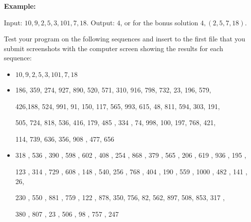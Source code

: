\documentclass[11pt]{article}
\begin{document}
\textbf{Example:}

Input: $10,9,2,5,3,101,7, 18$.
Output: $4$,  or for the bonus solution $4, (2,5,7,18)$.
\smallskip

Test your program on the following sequences and insert to the first file that you submit  screenshots with the computer screen showing the results for each sequence:

\begin{itemize}
\item $10,9,2,5,3,101, 7, 18$
\item 186, 359, 274,  927,  890,  520,  571,  310,  916,  798,  732,  23, 196, 579, 

426,188,  524,  991,   91,  150,  117,  565,  993,  615,   48, 811,  594,  303,  191,  

505,  724,  818,  536,  416,  179,  485 , 334  , 74,  998,  100,  197,  768,  421,  

114,  739,  636,  356,  908 , 477,  656
\item 318 ,  536  , 390  , 598  , 602 ,  408  , 254  , 868 ,  379  , 565  ,  206  ,  619  ,  936  ,  195 ,  

 123  ,  314  ,  729 ,  608  , 148 ,  540,   256 ,  768 ,  404  ,  190  ,  559 ,  1000 ,   482  ,  141 ,  26,   
 
  230  ,  550  ,  881  ,  759  ,  122 ,   878,    350,    756,     82,    562,    897,    508,    853,    317 ,   
  
  380 ,   807 ,    23 ,   506  ,   98 ,   757 ,   247
\end{itemize}
\end{document}
